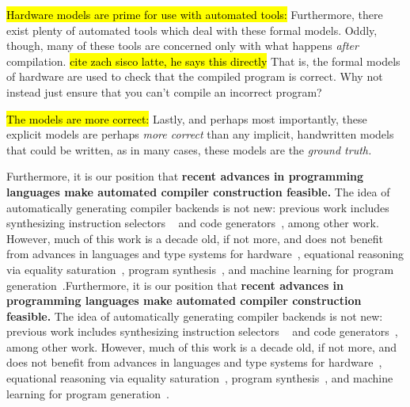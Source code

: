 \hl{Hardware models are prime for use with automated tools:}
Furthermore, 
  there exist plenty of automated
  tools
  which deal with
  these formal models.
Oddly, though,
  many of these tools
  are concerned only with
  what happens \textit{after}
  compilation.
\hl{cite zach sisco latte, he says this directly}
That is, the formal models
  of hardware
  are used to check that 
  the compiled program is correct.
Why not instead
  just ensure
  that you can't compile an incorrect
  program?

\hl{The models are more correct:}
Lastly, and perhaps most importantly,
  these explicit models
  are perhaps \textit{more correct}
  than any implicit, handwritten models
  that could be written,
  as in many cases, these models
  are the \textit{ground truth.}

Furthermore, it is our position that
  \textbf{recent advances
  in programming languages
  make automated compiler construction
  feasible.}
The idea of automatically generating
  compiler backends is not new:
  previous work includes
  synthesizing instruction selectors%
  ~\cite{buchwald2018synthesizing,dias2010automatically,brandner2007compiler,daly2022synthesizing}
  and code generators~\cite{leupers1997retargetable,brandner2013automatic},
  among other work.
However, much of this work
  is a decade old, if not more,
  and does not benefit from
  advances in
  languages and type systems
  for hardware~\cite{durst2020type,nigam2023modular,nigam2020predictable},
  equational reasoning via equality saturation~\cite{tate2009equality,willsey2021egg},
  program synthesis~\cite{solar2008program,torlak2013growing},
  and machine learning for program generation~\cite{alon2019code2vec,austin2021program}.Furthermore, it is our position that
  \textbf{recent advances
  in programming languages
  make automated compiler construction
  feasible.}
The idea of automatically generating
  compiler backends is not new:
  previous work includes
  synthesizing instruction selectors%
  ~\cite{buchwald2018synthesizing,dias2010automatically,brandner2007compiler,daly2022synthesizing}
  and code generators~\cite{leupers1997retargetable,brandner2013automatic},
  among other work.
However, much of this work
  is a decade old, if not more,
  and does not benefit from
  advances in
  languages and type systems
  for hardware~\cite{durst2020type,nigam2023modular,nigam2020predictable},
  equational reasoning via equality saturation~\cite{tate2009equality,willsey2021egg},
  program synthesis~\cite{solar2008program,torlak2013growing},
  and machine learning for program generation~\cite{alon2019code2vec,austin2021program}.


